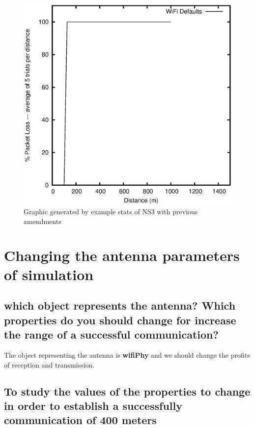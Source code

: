 \documentclass[a4paper,10pt]{article}
\begin{document}
\begin{figure}[h]
        	\centering
    \includegraphics[scale=0.55]{wifi-default.eps}
    \caption{Graphic generated by example stats of NS3 with previous amendments}
    \label{fig:inicio}
        \end{figure}


\section{Changing the antenna parameters of simulation}

\subsection{which object represents the antenna? Which properties do you should change for increase the range
of a successful communication?}

\singlespacing
The object representing the antenna is \textbf{wifiPhy} and we should change the profits of reception and transmission.

\subsection{To study the values of the properties to change in order to establish a successfully communication
of 400 meters}
\end{document}

